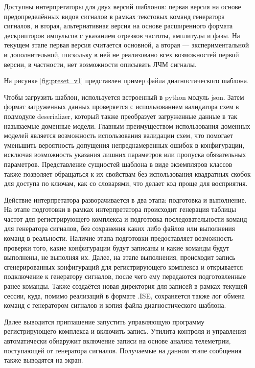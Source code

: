 \documentclass{report}
\begin{document}
Доступны интерпретаторы для двух версий шаблонов: первая версия на основе предопределённых видов сигналов в рамках текстовых команд генератора сигналов, и вторая, альтернативная версия на основе расширенного формата дескрипторов импульсов с указанием отрезков частоты, амплитуды и фазы. На текущем этапе первая версия считается основной, а вторая --- экспериментальной и дополнительной, поскольку в ней не реализовано всех возможностей первой версии, в частности, нет возможности описывать ЛЧМ сигналы.

На рисунке \ref{fig:preset_v1} представлен пример файла диагностического шаблона.


Чтобы загрузить шаблон, используется встроенный в python модуль json. Затем формат загруженных данных проверяется с использованием валидатора схем в подмодуле deserializer, который также преобразует загруженные данные в так называемые доменные модели. Главным преимуществом использования доменных моделей является возможность использования валидации схем, что помогает уменьшить вероятность допущения непреднамеренных ошибок в конфигурации, исключая возможность указания лишних параметров или пропуска обязательных параметров. Представление сущностей шаблона в виде экземпляров классов также позволяет обращаться к их свойствам без использования квадратных скобок для доступа по ключам, как со словарями, что делает код проще для восприятия.

Действие интерпретатора разворачивается в два этапа: подготовка и выполнение. На этапе подготовки в рамках интерпретатора происходит генерация таблицы частот для регистрирующего комплекса и подготовка последовательности команд для генератора сигналов, без сохранения каких либо файлов или выполнения команд в реальности. Наличие этапа подготовки предоставляет возможность проверки того, какие конфигурации будут записаны и какие команды будут выполнены, не выполняя их. Далее, на этапе выполнения, происходит запись сгенерированных конфигураций для регистрирующего комплекса и открывается подключение к генератору сигналов, после чего ему передаются подготовленные ранее команды. Также создаётся новая директория для записей в рамках текущей сессии, куда, помимо реализаций в формате .ISE, сохраняется также лог обмена команд с генератором сигналов и копия файла диагностического шаблона.

Далее выводится приглашение запустить управляющую программу регистрирующего комплекса и включить запись. Утилита контроля и управления автоматически обнаружит включение записи на основе анализа телеметрии, поступающей от генератора сигналов. Получаемые на данном этапе сообщения также выводятся на экран.
\end{document}
